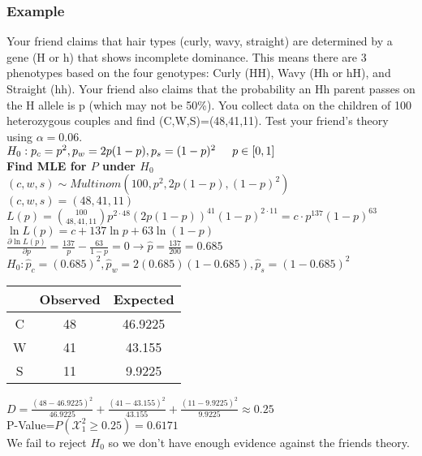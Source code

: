 \documentclass{article}
\begin{document}
\subsubsection{Example}
Your friend claims that hair types (curly, wavy, straight) are determined by a
gene (H or h) that shows incomplete dominance. This means there are 3 phenotypes based on the four genotypes: Curly (HH), Wavy (Hh or hH), and Straight (hh). Your friend also claims that the probability an Hh parent passes on the H allele is p (which may not be 50\%). You collect data on the
children of 100 heterozygous couples and find (C,W,S)=(48,41,11). Test your friend's theory using $\alpha=0.06$.\\
$H_0:p_c=p^2,p_w=2p(1-p),p_s=(1-p)^2\hspace*{0.2in}p\in[0,1]$\\
\textbf{Find MLE for $P$ under $H_0$}\\
$(c,w,s)\sim Multinom(100,p^2,2p(1-p),(1-p)^2)$\\
$(c,w,s)=(48,41,11)$\\
$L(p)=\binom{100}{48,41,11}p^{2\cdot48}(2p(1-p))^{41}(1-p)^{2\cdot11}=c\cdot p^{137}(1-p)^{63}$\\
$\ln L(p)=c + 137\ln p+63\ln(1-p)$\\
$\frac{\partial\ln L(p)}{\partial p}=\frac{137}{p}-\frac{63}{1-p}=0\rightarrow\hat p=\frac{137}{200}=0.685$\\
$H_0:\hat p_c=(0.685)^2,\hat p_w=2(0.685)(1-0.685),\hat p_s=(1-0.685)^2$
\begin{center}
    \begin{tabular}{c|c|c}
         & Observed & Expected\\
         \hline
         C & 48 & 46.9225\\
         \hline
         W & 41 & 43.155\\
         \hline
         S & 11 & 9.9225
    \end{tabular}
\end{center}
$D=\frac{(48-46.9225)^2}{46.9225}+\frac{(41-43.155)^2}{43.155}+\frac{(11-9.9225)^2}{9.9225}\approx0.25$\\
P-Value=$P(\mathcal{X}^2_1\geq0.25)=0.6171$\\
We fail to reject $H_0$ so we don't have enough evidence against the friends theory.
\end{document}
